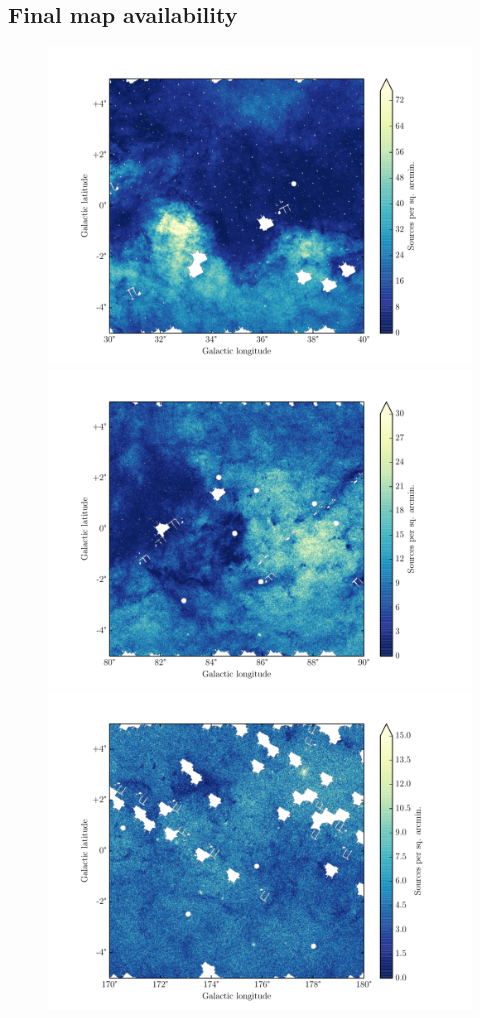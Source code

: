 \documentclass[a4paper,useAMS,usenatbib]{mn2e}
\begin{document}
\subsection{Final map availability}
\begin{figure}
\begin{center}
\includegraphics[width=1.0\linewidth]{figures/dmap-cutout-30-40--5-5.pdf} 
\includegraphics[width=1.0\linewidth]{figures/dmap-cutout-80-90--5-5.pdf} 
\includegraphics[width=1.0\linewidth]{figures/dmap-cutout-170-180--5-5.pdf} 

\end{center}
\end{figure}
\end{document}
